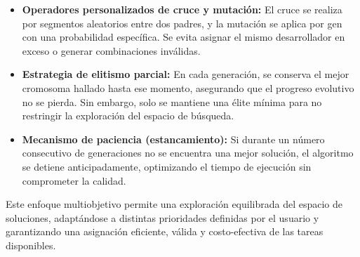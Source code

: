 \begin{itemize}
    \item \textbf{Operadores personalizados de cruce y mutación:} El cruce se realiza por segmentos aleatorios entre dos padres, y la mutación se aplica por gen con una probabilidad específica. Se evita asignar el mismo desarrollador en exceso o generar combinaciones inválidas.

    \item \textbf{Estrategia de elitismo parcial:} En cada generación, se conserva el mejor cromosoma hallado hasta ese momento, asegurando que el progreso evolutivo no se pierda. Sin embargo, solo se mantiene una élite mínima para no restringir la exploración del espacio de búsqueda.

    \item \textbf{Mecanismo de paciencia (estancamiento):} Si durante un número consecutivo de generaciones no se encuentra una mejor solución, el algoritmo se detiene anticipadamente, optimizando el tiempo de ejecución sin comprometer la calidad.
\end{itemize}

Este enfoque multiobjetivo permite una exploración equilibrada del espacio de soluciones, adaptándose a distintas prioridades definidas por el usuario y garantizando una asignación eficiente, válida y costo-efectiva de las tareas disponibles.





